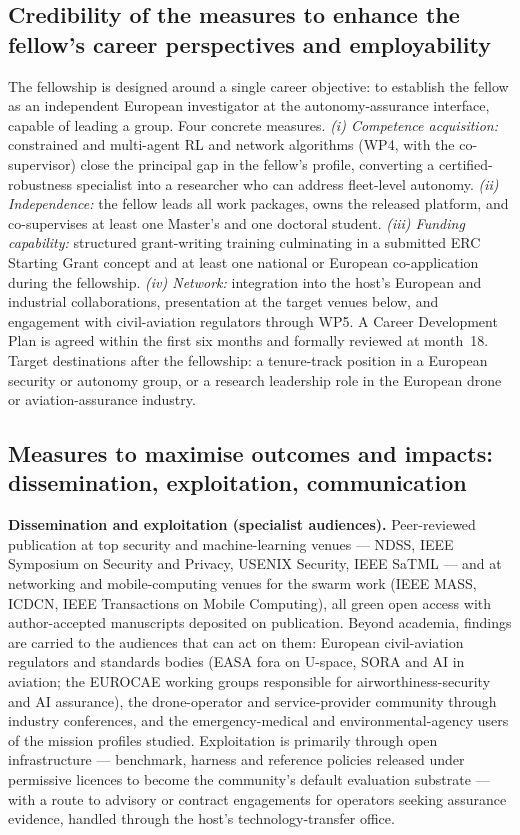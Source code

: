 \documentclass[11pt,a4paper]{article}
\begin{document}
\subsection{Credibility of the measures to enhance the fellow's career perspectives and employability}
The fellowship is designed around a single career objective: to establish the fellow as an independent European investigator at the autonomy-assurance interface, capable of leading a group. Four concrete measures. \emph{(i) Competence acquisition:} constrained and multi-agent RL and network algorithms (WP4, with the co-supervisor) close the principal gap in the fellow's profile, converting a certified-robustness specialist into a researcher who can address fleet-level autonomy. \emph{(ii) Independence:} the fellow leads all work packages, owns the released platform, and co-supervises at least one Master's and one doctoral student. \emph{(iii) Funding capability:} structured grant-writing training culminating in a submitted ERC Starting Grant concept and at least one national or European co-application during the fellowship. \emph{(iv) Network:} integration into the host's European and industrial collaborations, presentation at the target venues below, and engagement with civil-aviation regulators through WP5. A Career Development Plan is agreed within the first six months and formally reviewed at month~18. Target destinations after the fellowship: a tenure-track position in a European security or autonomy group, or a research leadership role in the European drone or aviation-assurance industry.

\subsection{Measures to maximise outcomes and impacts: dissemination, exploitation, communication}

\textbf{Dissemination and exploitation (specialist audiences).} Peer-reviewed publication at top security and machine-learning venues --- NDSS, IEEE Symposium on Security and Privacy, USENIX Security, IEEE SaTML --- and at networking and mobile-computing venues for the swarm work (IEEE MASS, ICDCN, IEEE Transactions on Mobile Computing), all green open access with author-accepted manuscripts deposited on publication. Beyond academia, findings are carried to the audiences that can act on them: European civil-aviation regulators and standards bodies (EASA fora on U-space, SORA and AI in aviation; the EUROCAE working groups responsible for airworthiness-security and AI assurance), the drone-operator and service-provider community through industry conferences, and the emergency-medical and environmental-agency users of the mission profiles studied. Exploitation is primarily through open infrastructure --- benchmark, harness and reference policies released under permissive licences to become the community's default evaluation substrate --- with a route to advisory or contract engagements for operators seeking assurance evidence, handled through the host's technology-transfer office.
\end{document}
